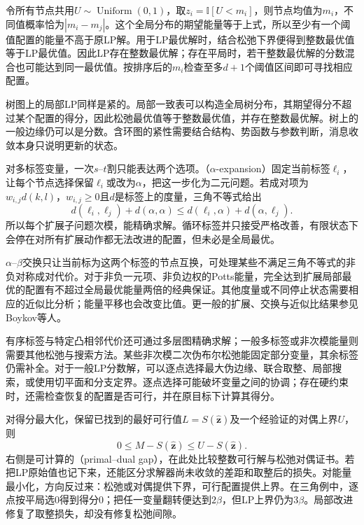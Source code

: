 令所有节点共用$U\sim\operatorname{Uniform}(0,1)$，取$z_i=\mathbb I[U<m_i]$，则节点均值为$m_i$，不同值概率恰为$|m_i-m_j|$。这个全局分布的期望能量等于上式，所以至少有一个阈值配置的能量不高于原LP解。用于LP最优解时，结合松弛下界便得到整数最优值等于LP最优值。因此LP存在整数最优解；存在平局时，若干整数最优解的分数混合也可能达到同一最优值。按排序后的$m_i$检查至多$d+1$个阈值区间即可寻找相应配置。

树图上的局部LP同样是紧的。局部一致表可以构造全局树分布，其期望得分不超过某个配置的得分，因此松弛最优值等于整数最优值，并存在整数最优解。树上的一般边缘仍可以是分数。含环图的紧性需要结合结构、势函数与参数判断，消息收敛本身只说明更新的状态。

对多标签变量，一次$s$--$t$割只能表达两个选项。（$\alpha$-expansion）固定当前标签$\ell_i$，让每个节点选择保留$\ell_i$或改为$\alpha$，把这一步化为二元问题。若成对项为$w_{i,j}d(k,l)$，$w_{i,j}\geq0$且$d$是标签上的度量，三角不等式给出
\[
  d(\ell_i,\ell_j)+d(\alpha,\alpha)
    \leq d(\ell_i,\alpha)+d(\alpha,\ell_j).
\]
所以每个扩展子问题次模，能精确求解。循环标签并只接受严格改善，有限状态下会停在对所有扩展动作都无法改进的配置，但未必是全局最优。

$\alpha$--$\beta$交换只让当前标为这两个标签的节点互换，可处理某些不满足三角不等式的非负对称成对代价。对于非负一元项、非负边权的Potts能量，完全达到扩展局部最优的配置有不超过全局最优能量两倍的经典保证。其他度量或不同停止状态需要相应的近似比分析；能量平移也会改变比值。更一般的扩展、交换与近似比结果参见Boykov等人。

有序标签与特定凸相邻代价还可通过多层图精确求解；一般多标签或非次模能量则需要其他松弛与搜索方法。某些非次模二次伪布尔松弛能固定部分变量，其余标签仍需补全。对于一般LP分数解，可以逐点选择最大伪边缘、联合取整、局部搜索，或使用切平面和分支定界。逐点选择可能破坏变量之间的协调；存在硬约束时，还需检查恢复的配置是否可行，并在原目标下计算其得分。

对得分最大化，保留已找到的最好可行值$L=S(\widehat{\bm z})$及一个经验证的对偶上界$U$，则
\begin{equation}
  0\leq M-S(\widehat{\bm z})\leq U-S(\widehat{\bm z}).
  \label{eq:pgm-variational-gap}
\end{equation}
右侧是可计算的（primal--dual gap），在此处比较整数可行解与松弛对偶证书。若把LP原始值也记下来，还能区分求解器尚未收敛的差距和取整后的损失。对能量最小化，方向反过来：松弛或对偶提供下界，可行配置提供上界。在三角例中，逐点按平局选$0$得到得分$0$；把任一变量翻转便达到$2\beta$，但LP上界仍为$3\beta$。局部改进修复了取整损失，却没有修复松弛间隙。

